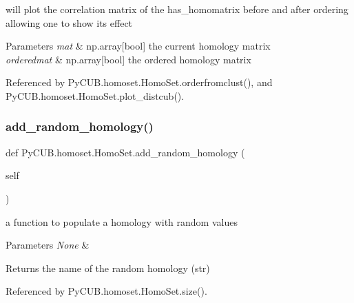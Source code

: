 will plot the correlation matrix of the has\+\_\+homomatrix before and after ordering allowing one to show its effect 


\begin{DoxyParams}{Parameters}
{\em mat} & np.\+array\mbox{[}bool\mbox{]} the current homology matrix \\
\hline
{\em orderedmat} & np.\+array\mbox{[}bool\mbox{]} the ordered homology matrix \\
\hline
\end{DoxyParams}


Referenced by Py\+C\+U\+B.\+homoset.\+Homo\+Set.\+orderfromclust(), and Py\+C\+U\+B.\+homoset.\+Homo\+Set.\+plot\+\_\+distcub().

\mbox{\label{class_py_c_u_b_1_1homoset_1_1_homo_set_a05935a3f03f2e2b61b2f3e7e0222e2a9}} 
\subsubsection{\texorpdfstring{add\+\_\+random\+\_\+homology()}{add\_random\_homology()}}
{\footnotesize\ttfamily def Py\+C\+U\+B.\+homoset.\+Homo\+Set.\+add\+\_\+random\+\_\+homology (\begin{DoxyParamCaption}\item[{}]{self }\end{DoxyParamCaption})}



a function to populate a homology with random values 


\begin{DoxyParams}{Parameters}
{\em None} & \\
\hline
\end{DoxyParams}
\begin{DoxyReturn}{Returns}
the name of the random homology (str) 
\end{DoxyReturn}


Referenced by Py\+C\+U\+B.\+homoset.\+Homo\+Set.\+size().

\mbox{\label{class_py_c_u_b_1_1homoset_1_1_homo_set_a2062c7f9c3c956d43172e1688504826a}} 
